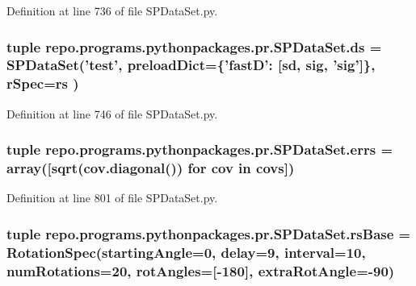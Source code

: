 Definition at line 736 of file S\-P\-Data\-Set.\-py.

\hypertarget{namespacerepo_1_1programs_1_1pythonpackages_1_1pr_1_1SPDataSet_a9dcba74d2fb20a6a41c191302ec5136b}{
\subsubsection[{ds}]{\setlength{\rightskip}{0pt plus 5cm}tuple repo.\-programs.\-pythonpackages.\-pr.\-S\-P\-Data\-Set.\-ds = {\bf S\-P\-Data\-Set}('test', preload\-Dict=\{'fast\-D'\-: \mbox{[}sd, sig, 'sig'\mbox{]}\}, r\-Spec=rs )}}\label{namespacerepo_1_1programs_1_1pythonpackages_1_1pr_1_1SPDataSet_a9dcba74d2fb20a6a41c191302ec5136b}


Definition at line 746 of file S\-P\-Data\-Set.\-py.

\hypertarget{namespacerepo_1_1programs_1_1pythonpackages_1_1pr_1_1SPDataSet_a3c7145cc42e7ec16a596f5996a8e70e2}{
\subsubsection[{errs}]{\setlength{\rightskip}{0pt plus 5cm}tuple repo.\-programs.\-pythonpackages.\-pr.\-S\-P\-Data\-Set.\-errs = array(\mbox{[}sqrt(cov.\-diagonal()) for cov in covs\mbox{]})}}\label{namespacerepo_1_1programs_1_1pythonpackages_1_1pr_1_1SPDataSet_a3c7145cc42e7ec16a596f5996a8e70e2}


Definition at line 801 of file S\-P\-Data\-Set.\-py.

\hypertarget{namespacerepo_1_1programs_1_1pythonpackages_1_1pr_1_1SPDataSet_a6b49ba99ee674be07d78e57e0d6a4506}{
\subsubsection[{rs\-Base}]{\setlength{\rightskip}{0pt plus 5cm}tuple repo.\-programs.\-pythonpackages.\-pr.\-S\-P\-Data\-Set.\-rs\-Base = Rotation\-Spec(starting\-Angle=0, delay=9, interval=10, num\-Rotations=20, rot\-Angles=\mbox{[}-\/180\mbox{]}, extra\-Rot\-Angle=-\/90)}}\label{namespacerepo_1_1programs_1_1pythonpackages_1_1pr_1_1SPDataSet_a6b49ba99ee674be07d78e57e0d6a4506}


